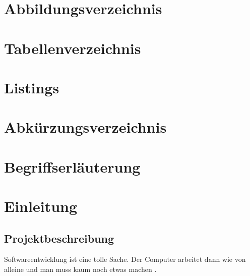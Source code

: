 \documentclass[11pt,toc=sectionentrywithoutdots, headheight=44pt, headings=optiontoheadandtoc]{scrartcl}
\begin{document}
\newpage
\setcounter{page}{1}


\tableofcontents


\setcounter{secnumdepth}{0}

\newpage
\section{Abbildungsverzeichnis}
\blindtext




\newpage

\section{Tabellenverzeichnis}
\blindtext\blindtext\blindtext

\section{Listings}
\blindtext\blindtext\blindtext
\newpage

\section{Abkürzungsverzeichnis}


\begin{acronym}[xxxxxxx]


\end{acronym}

\newpage

\section{Begriffserläuterung}
\blindtext\blindtext
\newpage

\setcounter{secnumdepth}{4}

\section{Einleitung}
\blindtext

\subsection{Projektbeschreibung}
Softwareentwicklung ist eine tolle Sache. Der Computer arbeitet dann wie von alleine und man muss kaum noch etwas machen \cite{Theis2014}.
\end{document}
